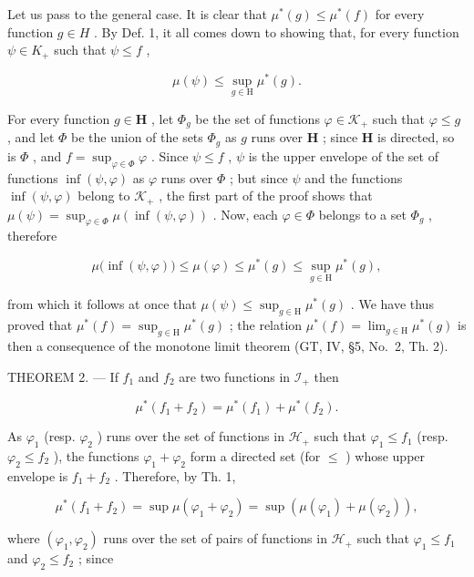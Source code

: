 Let us pass to the general case. It is clear that \(\mu^{*}(g) \leqslant \mu^{*}(f)\) for every function \(g \in H\) . By Def. 1, it all comes down to showing that, for every function \(\psi \in K_{+}\) such that \(\psi \leqslant f\) ,

\[
\mu (\psi) \leqslant \sup _ {g \in \mathrm{H}} \mu^ {*} (g).
\]

For every function \(g \in \mathbf{H}\) , let \(\Phi_g\) be the set of functions \(\varphi \in \mathcal{K}_+\) such that \(\varphi \leqslant g\) , and let \(\Phi\) be the union of the sets \(\Phi_g\) as \(g\) runs over \(\mathbf{H}\) ; since \(\mathbf{H}\) is directed, so is \(\Phi\) , and \(f = \sup_{\varphi \in \Phi} \varphi\) . Since \(\psi \leqslant f\) , \(\psi\) is the upper envelope of the set of functions \(\inf(\psi, \varphi)\) as \(\varphi\) runs over \(\Phi\) ; but since \(\psi\) and the functions \(\inf(\psi, \varphi)\) belong to \(\mathcal{K}_+\) , the first part of the proof shows that \(\mu(\psi) = \sup_{\varphi \in \Phi} \mu(\inf(\psi, \varphi))\) . Now, each \(\varphi \in \Phi\) belongs to a set \(\Phi_g\) , therefore

\[
\mu \big (\inf (\psi , \varphi) \big) \leqslant \mu (\varphi) \leqslant \mu^ {*} (g) \leqslant \sup _ {g \in \mathrm{H}} \mu^ {*} (g),
\]

from which it follows at once that \(\mu(\psi) \leqslant \sup_{g \in \mathrm{H}} \mu^{*}(g)\) . We have thus proved that \(\mu^{*}(f) = \sup_{g \in \mathrm{H}} \mu^{*}(g)\) ; the relation \(\mu^{*}(f) = \lim_{g \in \mathrm{H}} \mu^{*}(g)\) is then a consequence of the monotone limit theorem (GT, IV, §5, No.~2, Th. 2).

THEOREM 2. --- If \(f_1\) and \(f_2\) are two functions in \(\mathcal{I}_+\) then

\[
\mu^ {*} (f _ {1} + f _ {2}) = \mu^ {*} (f _ {1}) + \mu^ {*} (f _ {2}).\tag{3}
\]

As \(\varphi_{1}\) (resp. \(\varphi_{2}\) ) runs over the set of functions in \(\mathcal{H}_{+}\) such that \(\varphi_{1} \leqslant f_{1}\) (resp. \(\varphi_{2} \leqslant f_{2}\) ), the functions \(\varphi_{1} + \varphi_{2}\) form a directed set (for \(\leqslant\) ) whose upper envelope is \(f_{1} + f_{2}\) . Therefore, by Th. 1,

\[
\mu^ {*} (f _ {1} + f _ {2}) = \sup \mu (\varphi_ {1} + \varphi_ {2}) = \sup \left(\mu (\varphi_ {1}) + \mu (\varphi_ {2})\right),
\]

where \((\varphi_{1},\varphi_{2})\) runs over the set of pairs of functions in \(\mathcal{H}_{+}\) such that \(\varphi_1\leqslant f_1\) and \(\varphi_{2}\leqslant f_{2}\) ; since

